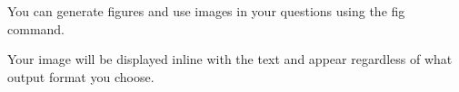 \documentclass[12pt]{exam}
\begin{document}
\begin{questions}
                You can generate figures and use images in your questions using the fig command.
                \begin{comment} pyxam!fig

import matplotlib.pyplot as plt
plt.plot([1,2,3,4])
plt.ylabel('Y axis')
plt.xlabel('X axis')
plt.title('A Simple Graph')
plt.show()

                \end{comment}
                Your image will be displayed inline with the text and appear regardless of what output format you choose.

        \end{questions}



    
\end{document}
